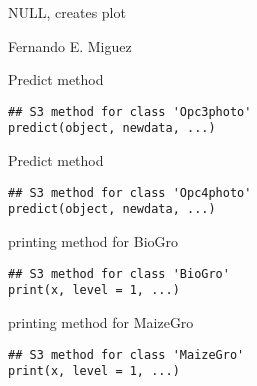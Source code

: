 \documentclass[letterpaper]{book}
\begin{document}
%
\begin{Value}
NULL, creates plot
\end{Value}
%
\begin{Author}\relax
Fernando E. Miguez
\end{Author}
%
\begin{Description}\relax
Predict method
\end{Description}
%
\begin{Usage}
\begin{verbatim}
## S3 method for class 'Opc3photo'
predict(object, newdata, ...)
\end{verbatim}
\end{Usage}
%
\begin{Description}\relax
Predict method
\end{Description}
%
\begin{Usage}
\begin{verbatim}
## S3 method for class 'Opc4photo'
predict(object, newdata, ...)
\end{verbatim}
\end{Usage}
%
\begin{Description}\relax
printing method for BioGro
\end{Description}
%
\begin{Usage}
\begin{verbatim}
## S3 method for class 'BioGro'
print(x, level = 1, ...)
\end{verbatim}
\end{Usage}
%
\begin{Arguments}
\begin{ldescription}
\item[\code{x}] 
\end{ldescription}
\end{Arguments}
%
\begin{Description}\relax
printing method for MaizeGro
\end{Description}
%
\begin{Usage}
\begin{verbatim}
## S3 method for class 'MaizeGro'
print(x, level = 1, ...)
\end{verbatim}
\end{Usage}
\end{document}
